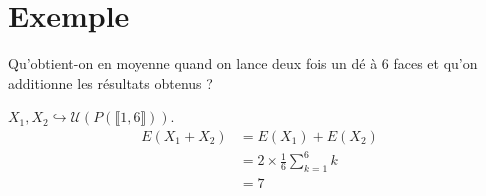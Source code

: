 \documentclass[../main.tex]{subfiles}
\begin{document}
\section{Exemple}
\begin{tcolorbox}[title=Exemple 33.7, title filled=false, colframe=darkgreen, colback=darkgreen!10!white]
    Qu'obtient-on en moyenne quand on lance deux fois un dé à 6 faces et qu'on additionne les résultats obtenus ?
\end{tcolorbox}

\noindent $X_1, X_2 \hookrightarrow \mathcal{U}(P(\llbracket 1, 6 \rrbracket))$. 
\begin{align*}
    E(X_1 + X_2) &= E(X_1) + E(X_2) \\
    &= 2\times \frac{1}{6} \sum_{k=1}^{6} k \\
    &= 7
\end{align*}
\end{document}
